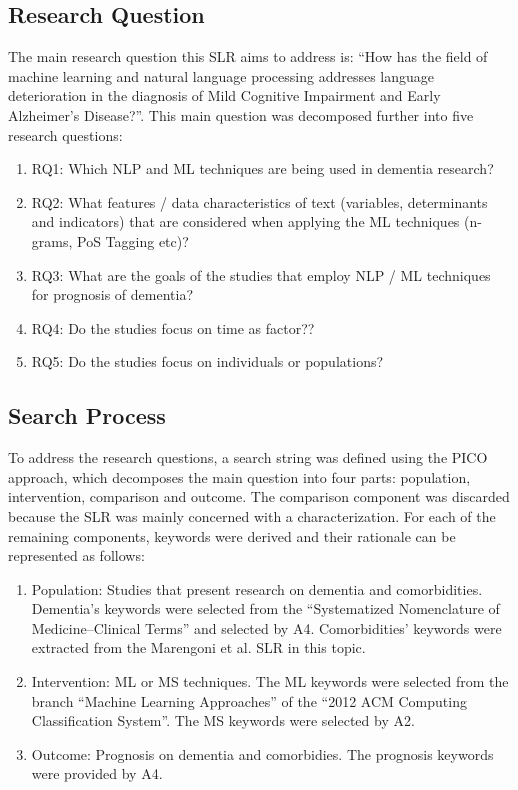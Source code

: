 \documentclass[12pt]{article}
\begin{document}
\subsection{Research Question}
The main research question this SLR aims to address is: “How has the field of machine learning and natural language processing addresses language deterioration in the diagnosis of Mild Cognitive Impairment and Early Alzheimer's Disease?”. This main question was decomposed further into five research questions:
\begin{enumerate}
	\item RQ1: Which NLP and ML techniques are being used in dementia research?
	\item RQ2: What features / data characteristics of text (variables, determinants and indicators) that are considered when applying the ML techniques (n-grams, PoS Tagging etc)?
	\item RQ3: What are the goals of the studies that employ NLP / ML techniques for prognosis of dementia?
	\item RQ4: Do the studies focus on time as factor??
	\item RQ5: Do the studies focus on individuals or populations?
\end{enumerate}
\subsection{Search Process}

To address the research questions, a search string was defined using the PICO approach, which decomposes the main question into four parts: population, intervention, comparison and outcome. The comparison component was discarded because the SLR was mainly concerned with a characterization. For each of the remaining components, keywords were derived and their rationale can be represented as follows:
\begin{enumerate}
	\item Population: Studies that present research on dementia and comorbidities. Dementia’s keywords were selected from the “Systematized Nomenclature of Medicine–Clinical Terms” and selected by A4. Comorbidities’ keywords were extracted from the Marengoni et al. SLR in this topic.
	\item Intervention: ML or MS techniques. The ML keywords were selected from the branch “Machine Learning Approaches” of the “2012 ACM Computing Classification System”. The MS keywords were selected by A2.
	\item Outcome: Prognosis on dementia and comorbidies. The prognosis keywords were provided
by A4.
\end{enumerate}
\end{document}
